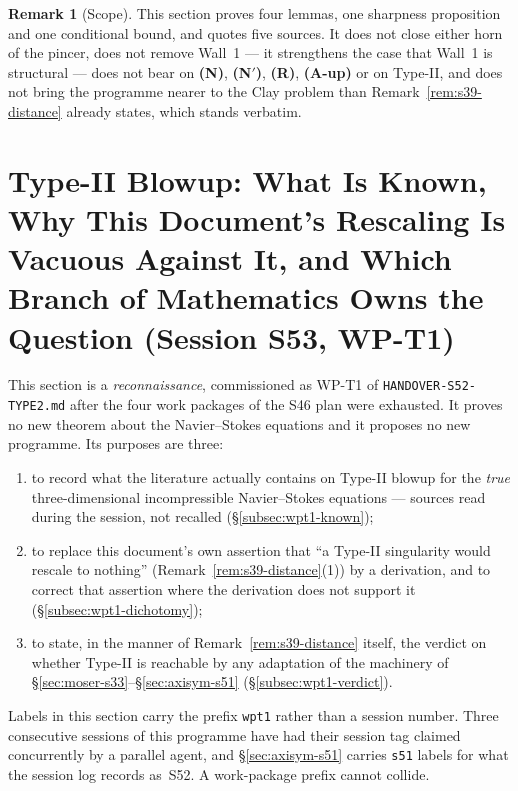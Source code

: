 \documentclass[11pt]{article}
\theoremstyle{definition}
\newtheorem{remark}[theorem]{Remark}
\theoremstyle{remark}
\begin{document}
\begin{remark}[Scope]\label{rem:s51-scope}
  This section proves four lemmas, one sharpness proposition and one
  conditional bound, and quotes five sources. It does not close either horn of
  the pincer, does not remove Wall~1 --- it strengthens the case that Wall~1
  is structural --- does not bear on \textbf{(N)}, \textbf{(N$'$)},
  \textbf{(R)}, \textbf{(A-up)} or on Type-II, and does not bring the
  programme nearer to the Clay problem than
  Remark~\ref{rem:s39-distance} already states, which stands verbatim.
\end{remark}

\section{Type-II Blowup: What Is Known, Why This Document's Rescaling Is
Vacuous Against It, and Which Branch of Mathematics Owns the Question
(Session S53, WP-T1)}
\label{sec:typeII-wpt1}

This section is a \emph{reconnaissance}, commissioned as WP-T1 of
\texttt{HANDOVER-S52-TYPE2.md} after the four work packages of the S46 plan
were exhausted. It proves no new theorem about the Navier--Stokes equations
and it proposes no new programme. Its purposes are three:

\begin{enumerate}[label=(\roman*)]
  \item to record what the literature actually contains on Type-II blowup for
    the \emph{true} three-dimensional incompressible Navier--Stokes equations
    --- sources read during the session, not recalled
    (\S\ref{subsec:wpt1-known});
  \item to replace this document's own assertion that ``a Type-II singularity
    would rescale to nothing'' (Remark~\ref{rem:s39-distance}(1)) by a
    derivation, and to correct that assertion where the derivation does not
    support it (\S\ref{subsec:wpt1-dichotomy});
  \item to state, in the manner of Remark~\ref{rem:s39-distance} itself, the
    verdict on whether Type-II is reachable by any adaptation of the
    machinery of \S\ref{sec:moser-s33}--\S\ref{sec:axisym-s51}
    (\S\ref{subsec:wpt1-verdict}).
\end{enumerate}

Labels in this section carry the prefix \texttt{wpt1} rather than a session
number. Three consecutive sessions of this programme have had their session
tag claimed concurrently by a parallel agent, and \S\ref{sec:axisym-s51}
carries \texttt{s51} labels for what the session log records as~S52. A
work-package prefix cannot collide.
\end{document}
